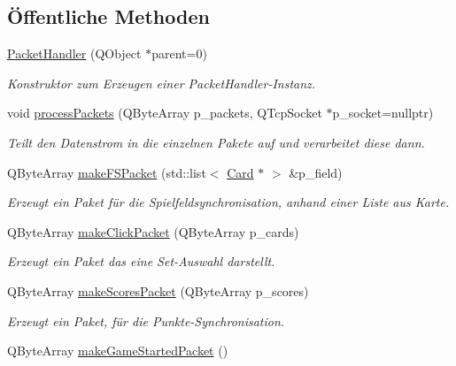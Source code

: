 \subsection*{Öffentliche Methoden}
\begin{DoxyCompactItemize}
\item 
\hyperlink{class_packet_handler_a4728b3f54723e7f05e947eb56433d4b5}{Packet\+Handler} (Q\+Object $\ast$parent=0)
\begin{DoxyCompactList}\small\item\em Konstruktor zum Erzeugen einer Packet\+Handler-\/\+Instanz. \end{DoxyCompactList}\item 
void \hyperlink{class_packet_handler_a4d948da50131eeef0d977e0693ff9741}{process\+Packets} (Q\+Byte\+Array p\+\_\+packets, Q\+Tcp\+Socket $\ast$p\+\_\+socket=nullptr)
\begin{DoxyCompactList}\small\item\em Teilt den Datenstrom in die einzelnen Pakete auf und verarbeitet diese dann. \end{DoxyCompactList}\item 
Q\+Byte\+Array \hyperlink{class_packet_handler_a9e2e51aa1b548ec1b209ee682bdd4c54}{make\+F\+S\+Packet} (std\+::list$<$ \hyperlink{class_card}{Card} $\ast$ $>$ \&p\+\_\+field)
\begin{DoxyCompactList}\small\item\em Erzeugt ein Paket für die Spielfeldsynchronisation, anhand einer Liste aus Karte. \end{DoxyCompactList}\item 
Q\+Byte\+Array \hyperlink{class_packet_handler_abd77784148000bbe33af457c09a05022}{make\+Click\+Packet} (Q\+Byte\+Array p\+\_\+cards)
\begin{DoxyCompactList}\small\item\em Erzeugt ein Paket das eine Set-\/\+Auswahl darstellt. \end{DoxyCompactList}\item 
Q\+Byte\+Array \hyperlink{class_packet_handler_a256842b9c4243360441366ae04838b0d}{make\+Scores\+Packet} (Q\+Byte\+Array p\+\_\+scores)
\begin{DoxyCompactList}\small\item\em Erzeugt ein Paket, für die Punkte-\/\+Synchronisation. \end{DoxyCompactList}\item 
Q\+Byte\+Array \hyperlink{class_packet_handler_aef3b383774fb1894dcd99dd40b3f735a}{make\+Game\+Started\+Packet} ()

\end{DoxyCompactItemize}
